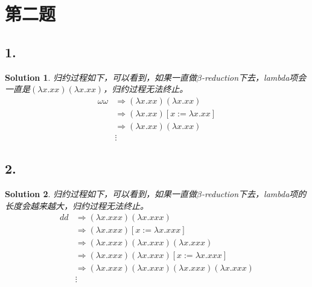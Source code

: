 \documentclass[UTF8]{article}
\newtheorem{Solution}{Solution}
\begin{document}
\section{第二题}
    \subsection*{1.}
        \begin{Solution}
            归约过程如下，可以看到，如果一直做$\beta$-reduction下去，lambda项会一直是$(\lambda x.x x)(\lambda x.x x)$，归约过程无法终止。
            \begin{equation*}
                \begin{split}
                    \omega \omega &\Rightarrow (\lambda x.x x)(\lambda x.x x) \\
                    &\Rightarrow (\lambda x.x x)[x:=\lambda x.x x]\\
                    &\Rightarrow (\lambda x.x x)(\lambda x.x x)\\
                    &\vdots
                \end{split}
            \end{equation*}
        \end{Solution}
    \subsection*{2.}
        \begin{Solution}
            归约过程如下，可以看到，如果一直做$\beta$-reduction下去，lambda项的长度会越来越大，归约过程无法终止。
            \begin{equation*}
                \begin{split}
                    d d &\Rightarrow (\lambda x.x x x)(\lambda x.x x x) \\
                    &\Rightarrow (\lambda x.x x x)[x:=\lambda x.x x x]\\
                    &\Rightarrow (\lambda x.x x x)(\lambda x.x x x)(\lambda x.x x x)\\
                    &\Rightarrow (\lambda x.x x x)(\lambda x.x x x)[x:=\lambda x.x x x]\\
                    &\Rightarrow (\lambda x.x x x)(\lambda x.x x x)(\lambda x.x x x)(\lambda x.x x x)\\
                    &\vdots
                \end{split}
            \end{equation*}
        \end{Solution}
\end{document}
